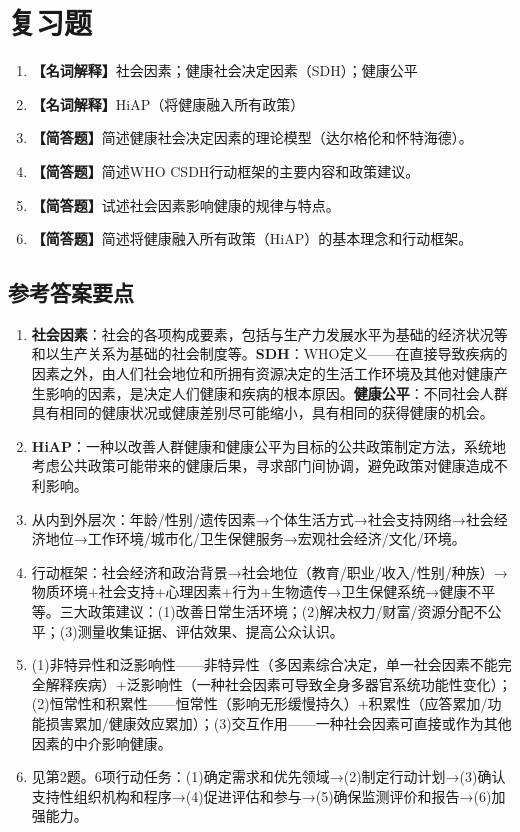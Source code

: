 \section{复习题}

\begin{enumerate}[leftmargin=*, itemsep=8pt]
    \item \textbf{【名词解释】}社会因素；健康社会决定因素（SDH）；健康公平
    \item \textbf{【名词解释】}HiAP（将健康融入所有政策）
    \item \textbf{【简答题】}简述健康社会决定因素的理论模型（达尔格伦和怀特海德）。
    \item \textbf{【简答题】}简述WHO CSDH行动框架的主要内容和政策建议。
    \item \textbf{【简答题】}试述社会因素影响健康的规律与特点。
    \item \textbf{【简答题】}简述将健康融入所有政策（HiAP）的基本理念和行动框架。
\end{enumerate}

\subsection*{参考答案要点}

\begin{enumerate}[leftmargin=*, itemsep=5pt]
    \item \textbf{社会因素}：社会的各项构成要素，包括与生产力发展水平为基础的经济状况等和以生产关系为基础的社会制度等。\textbf{SDH}：WHO定义——在直接导致疾病的因素之外，由人们社会地位和所拥有资源决定的生活工作环境及其他对健康产生影响的因素，是决定人们健康和疾病的根本原因。\textbf{健康公平}：不同社会人群具有相同的健康状况或健康差别尽可能缩小，具有相同的获得健康的机会。
    \item \textbf{HiAP}：一种以改善人群健康和健康公平为目标的公共政策制定方法，系统地考虑公共政策可能带来的健康后果，寻求部门间协调，避免政策对健康造成不利影响。
    \item 从内到外层次：年龄/性别/遗传因素→个体生活方式→社会支持网络→社会经济地位→工作环境/城市化/卫生保健服务→宏观社会经济/文化/环境。
    \item 行动框架：社会经济和政治背景→社会地位（教育/职业/收入/性别/种族）→物质环境+社会支持+心理因素+行为+生物遗传→卫生保健系统→健康不平等。三大政策建议：(1)改善日常生活环境；(2)解决权力/财富/资源分配不公平；(3)测量收集证据、评估效果、提高公众认识。
    \item (1)非特异性和泛影响性——非特异性（多因素综合决定，单一社会因素不能完全解释疾病）+泛影响性（一种社会因素可导致全身多器官系统功能性变化）；(2)恒常性和积累性——恒常性（影响无形缓慢持久）+积累性（应答累加/功能损害累加/健康效应累加）；(3)交互作用——一种社会因素可直接或作为其他因素的中介影响健康。
    \item 见第2题。6项行动任务：(1)确定需求和优先领域→(2)制定行动计划→(3)确认支持性组织机构和程序→(4)促进评估和参与→(5)确保监测评价和报告→(6)加强能力。
\end{enumerate}

\newpage
